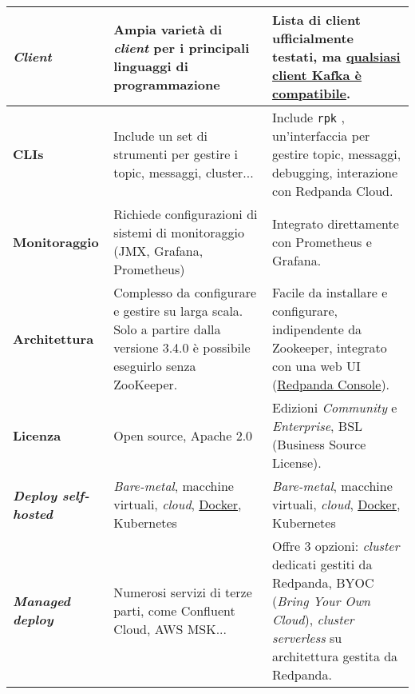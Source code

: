\begin{longtable}{|>{\centering\arraybackslash}p{}|>{\centering\arraybackslash}p{}|>{\centering\arraybackslash}p{}|}
	\hline
	\textbf{\textit{Client}}                    & Ampia varietà di \textit{client} per i principali linguaggi di programmazione                                                                               & Lista di client ufficialmente testati, ma \href{https://docs.redpanda.com/current/develop/kafka-clients/}{qualsiasi client Kafka è compatibile}.                       \\
	\hline
	\textbf{CLIs}                               & Include un set di strumenti per gestire i topic, messaggi, cluster...                                                                                       & Include \texttt{rpk} , un'interfaccia per gestire topic, messaggi, debugging, interazione con Redpanda Cloud.                                                          \\
	\hline
	\textbf{Monitoraggio}                       & Richiede configurazioni di sistemi di monitoraggio (JMX, Grafana, Prometheus)                                                                               & Integrato direttamente con Prometheus e Grafana.                                                                                                                       \\
	\hline
	\textbf{Architettura}                       & Complesso da configurare e gestire su larga scala. Solo a partire dalla versione 3.4.0 è possibile eseguirlo senza ZooKeeper.                               & Facile da installare e configurare, indipendente da Zookeeper, integrato con una web UI (\href{https://redpanda.com/redpanda-console-kafka-ui}{Redpanda Console}).     \\
	\hline
	\textbf{Licenza}                            & Open source, Apache 2.0                                                                                                                                     & Edizioni \textit{Community} e \textit{Enterprise}, BSL (Business Source License).                                                                                      \\
	\hline
	\textbf{\textit{Deploy self-hosted}}        & \textit{Bare-metal}, macchine virtuali, \textit{cloud}, \href{https://7last.github.io/docs/rtb/documentazione-interna/glossario#docker}{Docker}, Kubernetes & \textit{Bare-metal}, macchine virtuali, \textit{cloud}, \href{https://7last.github.io/docs/rtb/documentazione-interna/glossario#docker}{Docker}, Kubernetes            \\
	\hline
	\textbf{\textit{Managed deploy}}            & Numerosi servizi di terze parti, come Confluent Cloud, AWS MSK...                                                                                           & Offre 3 opzioni: \textit{cluster} dedicati gestiti da Redpanda, BYOC (\textit{Bring Your Own Cloud}), \textit{cluster serverless} su architettura gestita da Redpanda. \\

\end{longtable}
